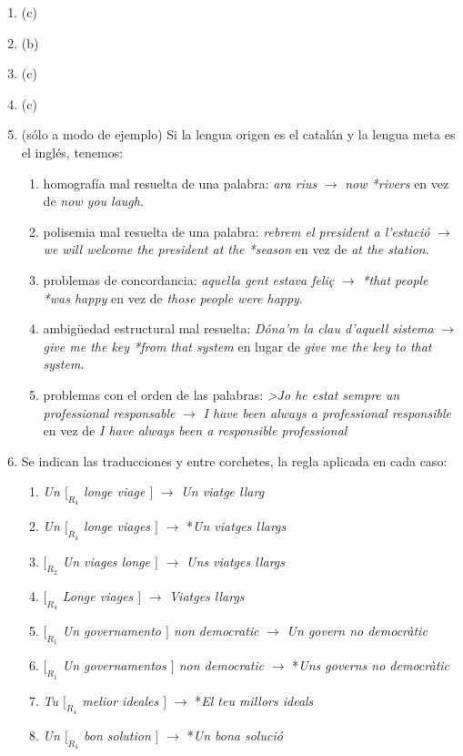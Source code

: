 \begin{enumerate}
\item (c) \item (b) \item (c) \item (c) 

\item (sólo a modo de ejemplo) Si la lengua origen es el catalán y la lengua meta es el inglés, tenemos: \begin{enumerate} \item homografía mal resuelta de una palabra: \emph{ara rius} $\to$ \emph{now *rivers} en vez de \emph{now you laugh}. \item polisemia mal resuelta de una palabra: \emph{rebrem el president a l'estació} $\to$ \emph{we will welcome the president at the *season} en vez de \emph{at the station}. \item problemas de concordancia: \emph{aquella gent estava feliç} $\to$ \emph{*that people *was happy} en vez de  \emph{those people were happy}. \item ambigüedad estructural mal resuelta: \emph{Dóna'm la clau d'aquell sistema} $\to$ \emph{give me the key *from that system} en lugar de \emph{give me the key to that system}. \item problemas con el orden de las palabras: \emph{>Jo he estat sempre un professional responsable} $\to$ \emph{I have been always a professional responsible} en vez de \emph{I have always been a responsible professional} \end{enumerate} 

\item Se indican las traducciones y entre corchetes, la regla aplicada en cada caso: \begin{enumerate} \item \emph{Un $[_{R_4}$ longe viage $]$} $\to$ \emph{Un viatge llarg} \item \emph{Un $[_{R_4}$ longe viages $]$} $\to$ *\emph{Un viatges llargs} \item \emph{$[_{R_2}$ Un viages longe $]$} $\to$ \emph{Uns viatges llargs} \item \emph{$[_{R_4}$ Longe viages $]$} $\to$ \emph{Viatges llargs} \item \emph{$[_{R_1}$ Un governamento $]$ non democratic} $\to$ \emph{Un govern no democràtic} \item \emph{$[_{R_1}$ Un governamentos $]$ non democratic} $\to$ *\emph{Uns governs no democràtic} \item \emph{Tu $[_{R_4}$ melior ideales $]$} $\to$ *\emph{El teu millors ideals} \item \emph{Un $[_{R_4}$ bon solution $]$} $\to$ *\emph{Un bona solució} \end{enumerate} 


\end{enumerate}
